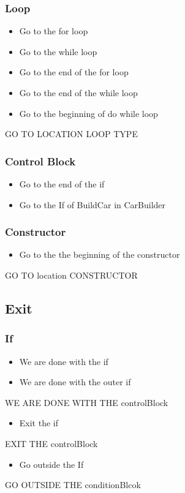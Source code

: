 \subsubsection{Loop}
\begin{itemize}
	\item Go to the for loop
	\item Go to the while loop
	\item Go to the end of the for loop
	\item Go to the end of the while loop
	\item Go to the beginning of do while loop
\end{itemize}
GO TO LOCATION LOOP TYPE
\subsubsection{Control Block}
\begin{itemize}
	\item Go to the end of the if
	\item Go to the If of BuildCar in CarBuilder
\end{itemize}
\subsubsection{Constructor}
\begin{itemize}
	\item Go to the the beginning of the constructor
\end{itemize}
GO TO location CONSTRUCTOR
\subsection{Exit}
\subsubsection{If}
\begin{itemize}
	\item We are done with the if
	\item We are done with the outer if
\end{itemize}
WE ARE DONE WITH THE controlBlock
\begin{itemize}
	\item Exit the if
\end{itemize}
EXIT THE controlBlock
\begin{itemize}
	\item Go outside the If
\end{itemize}
GO OUTSIDE THE conditionBlcok
